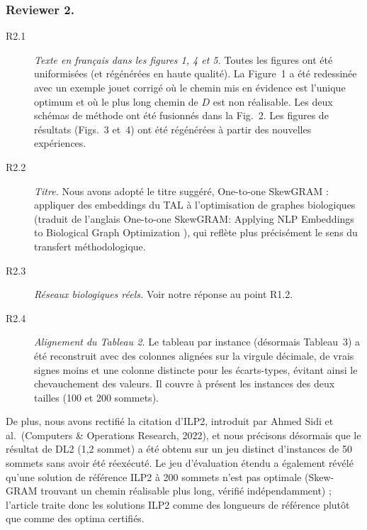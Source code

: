 \documentclass{llncs}
\begin{document}
\subsubsection{Reviewer 2.}

\begin{description}
\item[R2.1] \emph{Texte en français dans les figures 1, 4 et 5.} Toutes les figures ont été uniformisées (et régénérées en haute qualité). La Figure~1 a été redessinée avec un exemple jouet corrigé où le chemin mis en évidence est l'unique optimum et où le plus long chemin de $D$ est non réalisable. Les deux schémas de méthode ont été fusionnés dans la Fig.~2. Les figures de résultats (Figs.~3 et~4) ont été régénérées à partir des nouvelles expériences.

\item[R2.2] \emph{Titre.} Nous avons adopté le titre suggéré, \og One-to-one SkewGRAM : appliquer des embeddings du TAL à l'optimisation de graphes biologiques \fg{} (traduit de l'anglais \og One-to-one SkewGRAM: Applying NLP Embeddings to Biological Graph Optimization \fg), qui reflète plus précisément le sens du transfert méthodologique.

\item[R2.3] \emph{Réseaux biologiques réels.} Voir notre réponse au point R1.2.

\item[R2.4] \emph{Alignement du Tableau 2.} Le tableau par instance (désormais Tableau~3) a été reconstruit avec des colonnes alignées sur la virgule décimale, de vrais signes moins et une colonne distincte pour les écarts-types, évitant ainsi le chevauchement des valeurs. Il couvre à présent les instances des deux tailles (100 et 200 sommets).
\end{description}

De plus, nous avons rectifié la citation d'ILP2, introduit par Ahmed Sidi et al.\ (Computers \& Operations Research, 2022), et nous précisons désormais que le résultat de DL2 (1,2 sommet) a été obtenu sur un jeu distinct d'instances de 50 sommets sans avoir été réexécuté. Le jeu d'évaluation étendu a également révélé qu'une solution de référence ILP2 à 200 sommets n'est pas optimale (Skew-GRAM trouvant un chemin réalisable plus long, vérifié indépendamment) ; l'article traite donc les solutions ILP2 comme des longueurs de référence plutôt que comme des optima certifiés.
\end{document}
